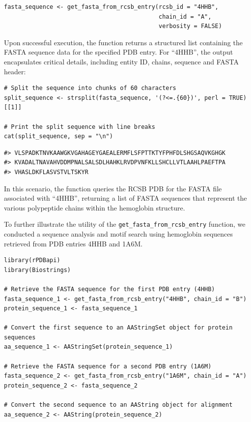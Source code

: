 \begin{verbatim}
fasta_sequence <- get_fasta_from_rcsb_entry(rcsb_id = "4HHB", 
                                            chain_id = "A", 
                                            verbosity = FALSE)
\end{verbatim}

Upon successful execution, the function returns a structured list containing the FASTA sequence data for the specified PDB entry. For ``4HHB'', the output encapsulates critical details, including entity ID, chains, sequence and FASTA header:

\begin{verbatim}
# Split the sequence into chunks of 60 characters
split_sequence <- strsplit(fasta_sequence, '(?<=.{60})', perl = TRUE)[[1]]

# Print the split sequence with line breaks
cat(split_sequence, sep = "\n") 
\end{verbatim}

\begin{verbatim}
#> VLSPADKTNVKAAWGKVGAHAGEYGAEALERMFLSFPTTKTYFPHFDLSHGSAQVKGHGK
#> KVADALTNAVAHVDDMPNALSALSDLHAHKLRVDPVNFKLLSHCLLVTLAAHLPAEFTPA
#> VHASLDKFLASVSTVLTSKYR
\end{verbatim}

In this scenario, the function queries the RCSB PDB for the FASTA file associated with ``4HHB'', returning a list of FASTA sequences that represent the various polypeptide chains within the hemoglobin structure.

To further illustrate the utility of the \texttt{get\_fasta\_from\_rcsb\_entry} function, we conducted a sequence analysis and motif search using hemoglobin sequences retrieved from PDB entries 4HHB and 1A6M.

\begin{verbatim}
library(rPDBapi)
library(Biostrings)

# Retrieve the FASTA sequence for the first PDB entry (4HHB)
fasta_sequence_1 <- get_fasta_from_rcsb_entry("4HHB", chain_id = "B")
protein_sequence_1 <- fasta_sequence_1

# Convert the first sequence to an AAStringSet object for protein sequences
aa_sequence_1 <- AAStringSet(protein_sequence_1)

# Retrieve the FASTA sequence for a second PDB entry (1A6M)
fasta_sequence_2 <- get_fasta_from_rcsb_entry("1A6M", chain_id = "A")
protein_sequence_2 <- fasta_sequence_2

# Convert the second sequence to an AAString object for alignment
aa_sequence_2 <- AAString(protein_sequence_2)
\end{verbatim}

